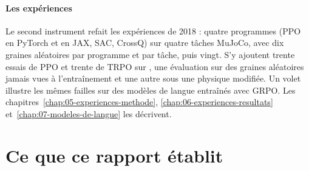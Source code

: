 \paragraph{Les expériences}
Le second instrument refait les expériences de 2018 : quatre programmes (PPO en PyTorch et en JAX, SAC, CrossQ) sur quatre tâches MuJoCo, avec
dix graines aléatoires par programme et par tâche, puis vingt. S'y ajoutent trente essais de PPO et
trente de TRPO sur , une évaluation sur des graines aléatoires jamais vues à
l'entraînement et une autre sous une physique modifiée. Un volet illustre les mêmes failles sur des
modèles de langue entraînés avec GRPO. Les chapitres~\ref{chap:05-experiences-methode}, \ref{chap:06-experiences-resultats} et~\ref{chap:07-modeles-de-langue} les décrivent.

\section{Ce que ce rapport établit}\label{sec:intro-contributions}

